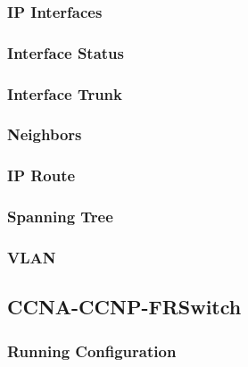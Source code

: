 \subsubsection{IP Interfaces}


\subsubsection{Interface Status}


\subsubsection{Interface Trunk}


\subsubsection{Neighbors}


\subsubsection{IP Route}


\subsubsection{Spanning Tree}


\subsubsection{VLAN}






\subsection{CCNA-CCNP-FRSwitch}
\subsubsection{Running Configuration}


